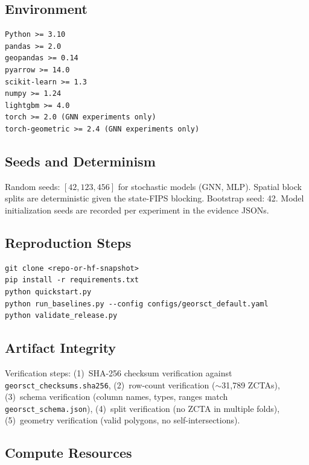 \documentclass{article}
\begin{document}
\subsection{Environment}

\begin{verbatim}
Python >= 3.10
pandas >= 2.0
geopandas >= 0.14
pyarrow >= 14.0
scikit-learn >= 1.3
numpy >= 1.24
lightgbm >= 4.0
torch >= 2.0 (GNN experiments only)
torch-geometric >= 2.4 (GNN experiments only)
\end{verbatim}

\subsection{Seeds and Determinism}

Random seeds: $[42, 123, 456]$ for stochastic models (GNN, MLP). Spatial block splits are deterministic given the state-FIPS blocking. Bootstrap seed: 42. Model initialization seeds are recorded per experiment in the evidence JSONs.

\subsection{Reproduction Steps}

\begin{verbatim}
git clone <repo-or-hf-snapshot>
pip install -r requirements.txt
python quickstart.py
python run_baselines.py --config configs/georsct_default.yaml
python validate_release.py
\end{verbatim}

\subsection{Artifact Integrity}

Verification steps: (1)~SHA-256 checksum verification against \texttt{georsct\_checksums.sha256}, (2)~row-count verification ($\sim$31{,}789 ZCTAs), (3)~schema verification (column names, types, ranges match \texttt{georsct\_schema.json}), (4)~split verification (no ZCTA in multiple folds), (5)~geometry verification (valid polygons, no self-intersections).

\subsection{Compute Resources}
\label{app:compute}
\end{document}
